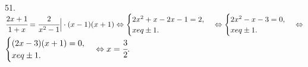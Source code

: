 51. $\cfrac{2x+1}{1+x}=\cfrac{2}{x^2-1}\Big|\cdot(x-1)(x+1)\Leftrightarrow\begin{cases}2x^2+x-2x-1=2,\\x
eq\pm1.\end{cases}
\Leftrightarrow\begin{cases}2x^2-x-3=0,\\x
eq\pm1.\end{cases}\Leftrightarrow$\\$\begin{cases}(2x-3)(x+1)=0,\\x
eq\pm1.\end{cases}\Leftrightarrow x=\cfrac{3}{2}.$\\
